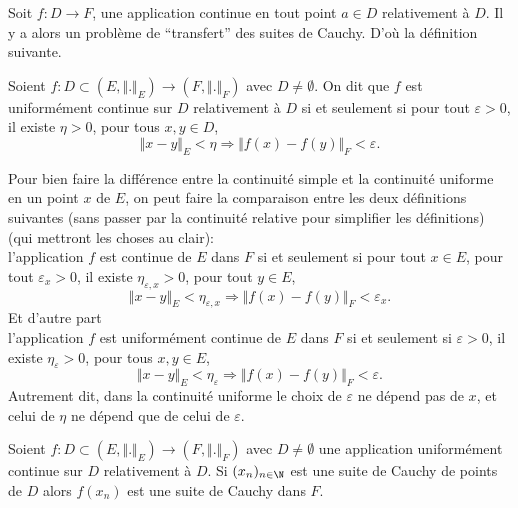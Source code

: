 \documentclass[class=report,crop=false]{standalone}
\begin{document}
Soit $f: D \rightarrow F$, une application continue en tout point $a \in D$ relativement à $D$. Il y a alors un problème de ``transfert''  des suites de Cauchy. D'où la définition suivante.

\begin{definition} 
\textcolor[rgb]{0.73,0.00,0.00}{
\noindent Soient $f: D \subset (E, \Vert . \Vert_E) \rightarrow (F, \Vert . \Vert_F)$ avec $D \neq \emptyset$. On dit que $f$ est uniformément continue sur $D$
relativement à $D$ si et seulement si  pour tout $\varepsilon >0$, il existe $\eta >0$, pour tous $x,y \in D$, 
\begin{equation*}
\Vert x-y \Vert_E < \eta \Longrightarrow \Vert f(x) - f(y) \Vert_F < \varepsilon.
\end{equation*}
}
\end{definition}

\begin{remarque*}
\textcolor[rgb]{0.00,0.00,1.00}{
Pour bien faire la différence entre la continuité simple et la continuité uniforme en un point $x$ de $E$, on peut faire la comparaison entre les deux définitions suivantes (sans passer par la continuité relative pour simplifier les définitions) (qui mettront les choses au clair):\\
l'application $f$ est continue de $E$ dans $F$ si et seulement si
pour tout $x \in E$, pour tout $\varepsilon_x >0$, il existe $\eta_{\varepsilon, x} >0$, pour tout $y \in E$, 
\begin{equation*}
\Vert x-y \Vert_E < \eta_{\varepsilon, x} \Longrightarrow \Vert f(x) - f(y) \Vert_F < \varepsilon_x.
\end{equation*}
Et d'autre part \\
l'application $f$ est uniformément continue de $E$ dans $F$ si et seulement si
 $\varepsilon >0$, il existe $\eta_{\varepsilon} >0$, pour tous $x,y \in E$, 
\begin{equation*}
\Vert x-y \Vert_E < \eta_{\varepsilon} \Longrightarrow \Vert f(x) - f(y) \Vert_F < \varepsilon.
\end{equation*}
Autrement dit, dans la continuité uniforme le choix de $\varepsilon$ ne dépend pas de $x$, et celui de $\eta$ ne dépend que de celui de $\varepsilon$.
}
\end{remarque*}

 \begin{proposition}
\textcolor[rgb]{0.50,0.00,0.25}{
Soient $f: D \subset (E, \Vert . \Vert_E) \rightarrow (F, \Vert . \Vert_F)$ avec $D \neq \emptyset$ une application uniformément continue sur $D$
relativement à $D$. Si $(x_n)_{n\in \N}$ est une suite de Cauchy de points de $D$ alors $f(x_n)$ est  une suite de Cauchy dans $F$.
}
\end{proposition}
\end{document}
